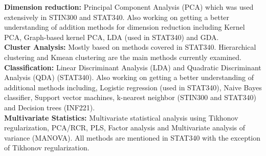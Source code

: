 \documentclass{article}
\begin{document}
\noindent \textbf{Dimension reduction:} Principal Component Analysis (PCA) which was used extensively in STIN300 and STAT340. Also working on getting a better understanding of addition methods for dimension reduction including Kernel PCA, Graph-based kernel PCA, LDA (used in STAT340) and GDA.\\

\noindent \textbf{Cluster Analysis:} Mostly based on methods covered in STAT340. Hierarchical clustering and Kmean clustering are the main methods currently examined.\\

\noindent \textbf{Classification:} Linear Discriminant Analysis (LDA) and Quadratic Discriminant Analysis (QDA) (STAT340). Also working on getting a better understanding of additional methods including, Logistic regression (used in STAT340), Naive Bayes classifier, Support vector machines, k-nearest neighbor (STIN300 and STAT340) and Decision trees (INF221). \\

\noindent \textbf{Multivariate Statistics:}  Multivariate statistical analysis using Tikhonov regularization, PCA/RCR, PLS, Factor analysis and Multivariate analysis of variance (MANOVA). All methods are mentioned in STAT340 with the exception of Tikhonov regularization.

 

\end{document}
